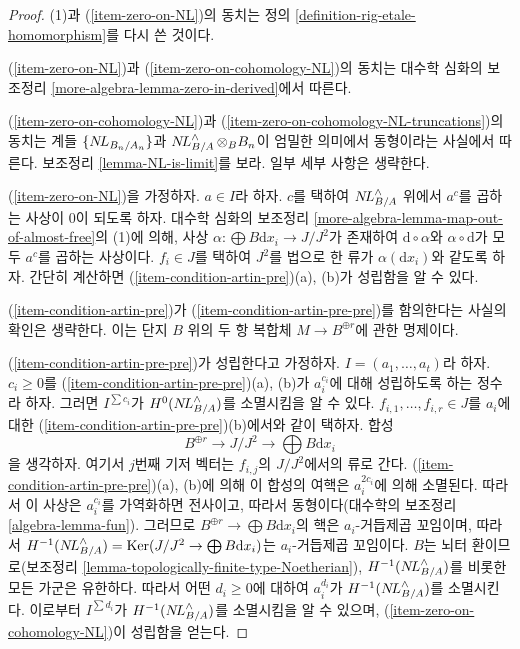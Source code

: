 \begin{proof}
(1)과 (\ref{item-zero-on-NL})의 동치는 정의
\ref{definition-rig-etale-homomorphism}를 다시 쓴 것이다.

\medskip\noindent
(\ref{item-zero-on-NL})과 (\ref{item-zero-on-cohomology-NL})의 동치는
대수학 심화의 보조정리 \ref{more-algebra-lemma-zero-in-derived}에서 따른다.

\medskip\noindent
(\ref{item-zero-on-cohomology-NL})과 (\ref{item-zero-on-cohomology-NL-truncations})의
동치는 계들 $\{\mathop{N\!L}\nolimits_{B_n/A_n}\}$과 $\mathop{N\!L}\nolimits_{B/A}^\wedge \otimes_B B_n$이
엄밀한 의미에서 동형이라는 사실에서 따른다. 보조정리 \ref{lemma-NL-is-limit}를 보라.
일부 세부 사항은 생략한다.

\medskip\noindent
(\ref{item-zero-on-NL})을 가정하자. $a \in I$라 하자.
$c$를 택하여 $\mathop{N\!L}\nolimits_{B/A}^\wedge$ 위에서 $a^c$를 곱하는 사상이 0이 되도록 하자.
대수학 심화의 보조정리 \ref{more-algebra-lemma-map-out-of-almost-free}의 (1)에 의해,
사상 $\alpha : \bigoplus B\text{d}x_i \to J/J^2$가 존재하여
$\text{d} \circ \alpha$와 $\alpha \circ \text{d}$가 모두 $a^c$를 곱하는 사상이다.
$f_i \in J$를 택하여 $J^2$를 법으로 한 류가 $\alpha(\text{d}x_i)$와 같도록 하자.
간단히 계산하면 (\ref{item-condition-artin-pre})(a), (b)가 성립함을 알 수 있다.

\medskip\noindent
(\ref{item-condition-artin-pre})가 (\ref{item-condition-artin-pre-pre})를 함의한다는
사실의 확인은 생략한다. 이는 단지 $B$ 위의 두 항 복합체
$M \to B^{\oplus r}$에 관한 명제이다.

\medskip\noindent
(\ref{item-condition-artin-pre-pre})가 성립한다고 가정하자.
$I = (a_1, \ldots, a_t)$라 하자.
$c_i \geq 0$를 (\ref{item-condition-artin-pre-pre})(a), (b)가
$a_i^{c_i}$에 대해 성립하도록 하는 정수라 하자.
그러면 $I^{\sum c_i}$가 $H^0(\mathop{N\!L}\nolimits_{B/A}^\wedge)$를 소멸시킴을 알 수 있다.
$f_{i, 1}, \ldots, f_{i, r} \in J$를 $a_i$에 대한
(\ref{item-condition-artin-pre-pre})(b)에서와 같이 택하자.
합성
$$
B^{\oplus r} \to J/J^2 \to \bigoplus B\text{d}x_i
$$
을 생각하자. 여기서 $j$번째 기저 벡터는 $f_{i, j}$의 $J/J^2$에서의 류로 간다.
(\ref{item-condition-artin-pre-pre})(a), (b)에 의해 이 합성의 여핵은
$a_i^{2c_i}$에 의해 소멸된다. 따라서 이 사상은 $a_i^{c_i}$를 가역화하면 전사이고,
따라서 동형이다(대수학의 보조정리 \ref{algebra-lemma-fun}).
그러므로 $B^{\oplus r} \to \bigoplus B\text{d}x_i$의 핵은 $a_i$-거듭제곱 꼬임이며,
따라서 $H^{-1}(\mathop{N\!L}\nolimits_{B/A}^\wedge) = \mathop{\mathrm{Ker}}(J/J^2 \to \bigoplus B\text{d}x_i)$는
$a_i$-거듭제곱 꼬임이다.
$B$는 뇌터 환이므로(보조정리 \ref{lemma-topologically-finite-type-Noetherian}),
$H^{-1}(\mathop{N\!L}\nolimits_{B/A}^\wedge)$를 비롯한 모든 가군은 유한하다.
따라서 어떤 $d_i \geq 0$에 대하여 $a_i^{d_i}$가 $H^{-1}(\mathop{N\!L}\nolimits_{B/A}^\wedge)$를 소멸시킨다.
이로부터 $I^{\sum d_i}$가 $H^{-1}(\mathop{N\!L}\nolimits_{B/A}^\wedge)$를 소멸시킴을 알 수 있으며,
(\ref{item-zero-on-cohomology-NL})이 성립함을 얻는다.


\end{proof}
